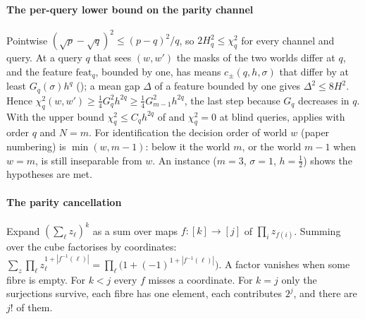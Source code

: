 \paragraph{The per-query lower bound on the parity channel} Pointwise
$(\sqrt p-\sqrt q)^2\le(p-q)^2/q$, so $2H^2_q\le\chi^2_q$ for every channel and query. At a query
$q$ that sees $(w,w')$ the masks of the two worlds differ at $q$, and the feature $\mathrm{feat}_q$,
bounded by one, has means $c_\pm(q,h,\sigma)$ that differ by at least $G_q(\sigma)h^{q}$
(); a mean gap $\Delta$ of a feature bounded by one gives $\Delta^2\le8H^2$. Hence
$\chi^2_q(w,w')\ge\frac14G_q^2h^{2q}\ge\frac14G_{m-1}^2h^{2q}$, the last step because $G_q$ decreases in
$q$. With the upper bound $\chi^2_q\le C_qh^{2q}$ of  and $\chi^2_q=0$ at blind
queries,  applies with order $q$ and $N=m$. For identification the
decision order of world $w$ (paper numbering) is $\min(w,m-1)$: below it the world $m$, or the
world $m-1$ when $w=m$, is still inseparable from $w$. An instance ($m=3$, $\sigma=1$, $h=\frac12$)
shows the hypotheses are met.

\paragraph{The parity cancellation} Expand $(\sum_\ell z_\ell)^k$ as a sum over maps
$f:[k]\to[j]$ of $\prod_iz_{f(i)}$. Summing over the cube factorises by coordinates:
$\sum_z\prod_\ell z_\ell^{1+|f^{-1}(\ell)|}=\prod_\ell\bigl(1+(-1)^{1+|f^{-1}(\ell)|}\bigr)$. A
factor vanishes when some fibre is empty. For $k<j$ every $f$ misses a coordinate. For $k=j$ only
the surjections survive, each fibre has one element, each contributes $2^j$, and there are $j!$
of them.

